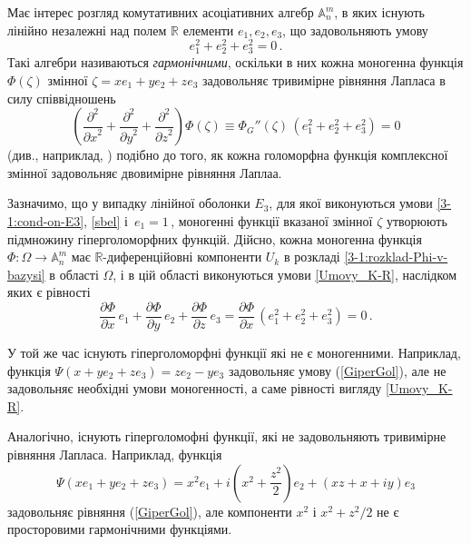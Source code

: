 \documentclass[11pt, reqno]{amsart}
\begin{document}
\begin{remark}
Має інтерес розгляд комутативних асоціативних алгебр $\mathbb{A}_n^m$, в яких існують
лінійно незалежні над полем $\mathbb R$ елементи $e_1, e_2, e_3$, що задовольняють умову
\begin{equation}
\label{sbel}
     e_1^2+e_2^2+e_3^2=0\,.
\end{equation}
Такі алгебри називаються {\it гармонічними}, оскільки в них кожна моногенна функція $\Phi(\zeta)$ змінної
$\zeta=xe_1+ye_2+ze_3$ задовольняє тривимірне рівняння Лапласа в силу
співвідношень
\[\left(\frac{{\partial}^2}{{\partial x}^2}+
 \frac{{\partial}^2}{{\partial y}^2}+
\frac{{\partial}^2}{{\partial z}^2}\right) \Phi(\zeta)\equiv
\Phi_G''(\zeta) \, (e_1^2+e_2^2+e_3^2)=0\]
(див., наприклад, \cite{Ketchum-28,Mel'nichenko75,Mel-Plaksa,Pl-Shp1,Plaksa12})
подібно до того, як кожна голоморфна функція комплексної змінної задовольняє двовимірне рівняння Лаплаа.


Зазначимо, що у випадку лінійної оболонки $E_3$, для якої
виконуються умови \eqref{3-1:cond-on-E3}, \eqref{sbel} і\, $e_1=1$\,,
моногенні функції вказаної змінної $\zeta$ утворюють підмножину гіперголоморфних функцій. 
Дійсно, кожна моногенна функція $\Phi \colon \Omega\rightarrow\mathbb{A}_n^m$ має
$\mathbb{R}$-диференційовні компоненти $U_k$ в розкладі \eqref{3-1:rozklad-Phi-v-bazysi} в області $\Omega$, 
і в цій області виконуються умови \eqref{Umovy_K-R}, наслідком яких є рівності
\[\frac{\partial\Phi}{\partial x}\,e_1+\frac{\partial\Phi}{\partial
y}\,e_{2}+\frac{\partial\Phi}{\partial z}\,e_{3}=\frac{\partial\Phi}{\partial x}\, (e_1^2+e_2^2+e_3^2)=0\,.\]

У той же час існують гіперголоморфні функції
які не є моногенними. Наприклад, функція
$\Psi(x+ye_2+ze_3)=ze_{2}-ye_{3}$ задовольняє умову
(\ref{GiperGol}), але не задовольняє необхідні умови моногенності, а саме рівності
вигляду \eqref{Umovy_K-R}.

Аналогічно, існують гіперголомофні функції, які не задовольняють тривимірне рівняння Лапласа. Наприклад, функція
\[\Psi(xe_1+ye_2+ze_3)=x^2e_1+i\left(x^2+\frac{z^2}{2}\right)e_2+(xz+x+iy)e_3\]
задовольняє рівняння (\ref{GiperGol}), але компоненти
$x^2$ і $x^2+z^2/2$ не є просторовими гармонічними функціями.
\end{remark}
































\label{last_page:\thearticlesnum}
\end{document}
